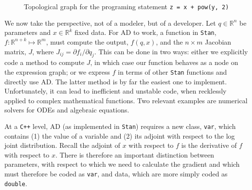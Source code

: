 \documentclass[11pt]{article}
\begin{document}
  \begin{figure}
  \begin{center}
  \end{center}
  \caption{Topological graph for the programing statement \texttt{z = x + pow(y, 2)}}
  \label{fig:ad}
  \end{figure}
  
  We now take the perspective, not of a modeler, but of a developer.
  Let $q \in \mathbb{R}^n$ be parameters and $x \in \mathbb{R}^k$ fixed data. 
  For AD to work, a function in \texttt{Stan}, $f: \mathbb{R}^{n + k} \mapsto \mathbb{R}^m$, 
  must compute the output, $f(q, x)$, and the $n \times m$ Jacobian matrix, $J$, 
  where $J_{ij} = \partial f_i / \partial q_j$.
  This can be done in two ways: either we explicitly code a method to compute $J$,
  in which case our function behaves as a node on the expression graph;
  or we express $f$ in terms of other \texttt{Stan} functions and directly use AD. 
  The latter method is by far the easiest one to implement.
  Unfortunately, it can lead to inefficient and unstable code, when recklessly applied
  to complex mathematical functions. Two relevant examples are numerical solvers for
  ODEs and algebraic equations.
  
  At a \texttt{C++} level, AD (as implemented in \texttt{Stan}) requires a new class, \texttt{var}, which
  contains (1) the value of a variable and (2) its adjoint with respect to the log 
  joint distribution. Recall the adjoint of $x$ with respect to $f$ is the derivative of $f$
  with respect to $x$. There is therefore an important distinction between parameters,
  with respect to which we need to calculate the gradient and 
  which must therefore be coded as \texttt{var}, and data, which are more simply 
  coded as \texttt{double}.
\end{document}
